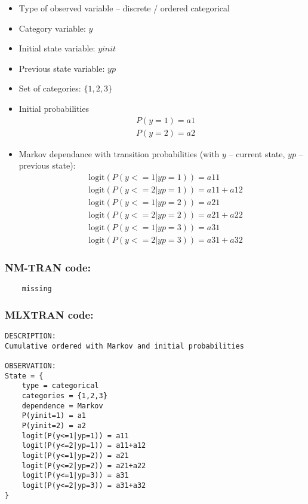 \begin{itemize}
\item
Type of observed variable -- discrete / ordered categorical
\item
Category variable: $y$
\item
Initial state variable: $yinit$
\item
Previous state variable: $yp$
\item
Set of categories: $\{1,2,3\}$
\item
Initial probabilities
\begin{align}
& P(y=1) = a1 \nonumber \\
& P(y=2) = a2  \nonumber
\end{align}
\item
Markov dependance with transition probabilities (with $y$ -- current state, $yp$ -- previous state):
\begin{align}
& \text{logit}(P(y<=1 | yp=1)) = a11 \nonumber \\
& \text{logit}(P(y<=2 | yp=1)) = a11 + a12\nonumber \\
& \text{logit}(P(y<=1 | yp=2)) = a21\nonumber \\
& \text{logit}(P(y<=2 | yp=2)) = a21 + a22\nonumber \\
& \text{logit}(P(y<=1 | yp=3)) = a31\nonumber \\
& \text{logit}(P(y<=2 | yp=3)) = a31 + a32\nonumber 
\end{align}
\end{itemize}

\subsubsection{NM-TRAN code:}

\myStartLine

\lstset{language=NONMEMdataSet}
\begin{lstlisting}
	missing
\end{lstlisting}

\myEndLine

\subsubsection{MLXTRAN code:}

\myStartLine

\lstset{language=MLXTRANcode}
\begin{lstlisting}
DESCRIPTION:
Cumulative ordered with Markov and initial probabilities

OBSERVATION:
State = {
	type = categorical
	categories = {1,2,3}
	dependence = Markov
	P(yinit=1) = a1
	P(yinit=2) = a2
	logit(P(y<=1|yp=1)) = a11
	logit(P(y<=2|yp=1)) = a11+a12
	logit(P(y<=1|yp=2)) = a21
	logit(P(y<=2|yp=2)) = a21+a22
	logit(P(y<=1|yp=3)) = a31
	logit(P(y<=2|yp=3)) = a31+a32
}
\end{lstlisting}


